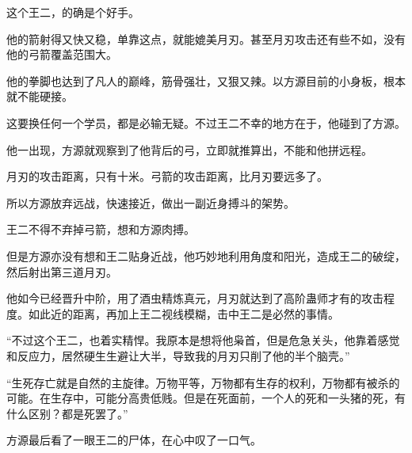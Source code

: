 \begin{this_body}
这个王二，的确是个好手。

他的箭射得又快又稳，单靠这点，就能媲美月刃。甚至月刃攻击还有些不如，没有他的弓箭覆盖范围大。

他的拳脚也达到了凡人的巅峰，筋骨强壮，又狠又辣。以方源目前的小身板，根本就不能硬接。

这要换任何一个学员，都是必输无疑。不过王二不幸的地方在于，他碰到了方源。

他一出现，方源就观察到了他背后的弓，立即就推算出，不能和他拼远程。

月刃的攻击距离，只有十米。弓箭的攻击距离，比月刃要远多了。

所以方源放弃远战，快速接近，做出一副近身搏斗的架势。

王二不得不弃掉弓箭，想和方源肉搏。

但是方源亦没有想和王二贴身近战，他巧妙地利用角度和阳光，造成王二的破绽，然后射出第三道月刃。

他如今已经晋升中阶，用了酒虫精炼真元，月刃就达到了高阶蛊师才有的攻击程度。如此近的距离，再加上王二视线模糊，击中王二是必然的事情。

“不过这个王二，也着实精悍。我原本是想将他枭首，但是危急关头，他靠着感觉和反应力，居然硬生生避让大半，导致我的月刃只削了他的半个脑壳。”

“生死存亡就是自然的主旋律。万物平等，万物都有生存的权利，万物都有被杀的可能。在生存中，可能分高贵低贱。但是在死面前，一个人的死和一头猪的死，有什么区别？都是死罢了。”

方源最后看了一眼王二的尸体，在心中叹了一口气。

\end{this_body}

